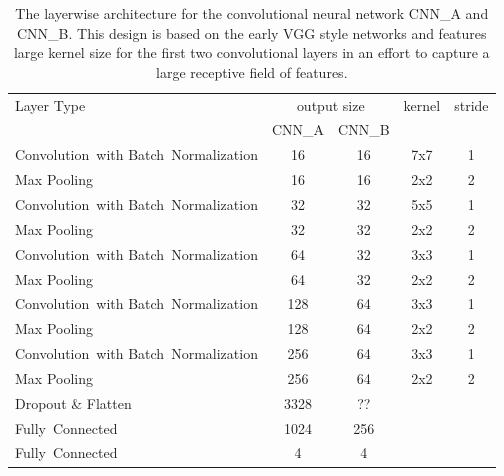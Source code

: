  \begin{table}[]
  \centering
  \begin{tabularx}{\textwidth}{Xcccc}
  \toprule
Layer Type                    & \multicolumn{2}{c}{output size} & kernel & stride  \\ 
                                                    & CNN\_A & CNN\_B &      &     \\\midrule

\mbox{Convolution with} \mbox{Batch Normalization}  & 16     & 16   & 7x7    & 1   \\ 
Max Pooling                                         & 16     & 16   & 2x2    & 2   \\ 
\mbox{Convolution with} \mbox{Batch Normalization}  & 32     & 32   & 5x5    & 1   \\ 
Max Pooling                                         & 32     & 32   & 2x2    & 2   \\ 
\mbox{Convolution with} \mbox{Batch Normalization}  & 64     & 32   & 3x3    & 1   \\ 
Max Pooling                                         & 64     & 32   & 2x2    & 2   \\ 
\mbox{Convolution with} \mbox{Batch Normalization}  & 128    & 64   & 3x3    & 1   \\ 
Max Pooling                                         & 128    & 64   & 2x2    & 2   \\ 
\mbox{Convolution with} \mbox{Batch Normalization}  & 256    & 64   & 3x3    & 1   \\ 
Max Pooling                                         & 256    & 64   & 2x2    & 2   \\ 
Dropout \& Flatten                                  & 3328   & ??   &        &     \\ 
\mbox{Fully Connected}                              & 1024   & 256  &        &     \\ 
\mbox{Fully Connected}                              & 4      & 4    &        &     \\ 
  \bottomrule
  \end{tabularx}
  \caption{The layerwise architecture for the convolutional neural network CNN\_A and CNN\_B. This design is based on the early VGG style networks and features large kernel size for the first two convolutional layers in an effort to capture a large receptive field of features.}
  \label{tab:layers_CNN_A}
  \end{table}


